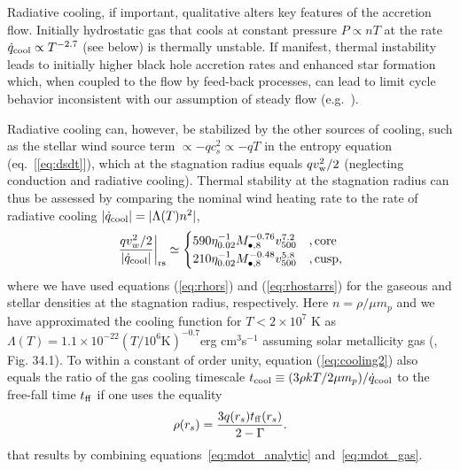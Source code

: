 \documentclass[usenatbib,fleqn]{mn2e}
\newcommand{\rs}{r_s}
\newcommand{\vw}{v_w}
\newcommand{\tff}{t_{\rm ff}}
\begin{document}
Radiative cooling, if important, qualitative alters key features of the accretion flow.  Initially hydrostatic gas that cools at constant pressure $P \propto nT$ at the rate $\dot{q}_{\rm cool} \propto T^{-2.7}$ (see below) is thermally unstable.  If manifest, thermal instability leads to initially higher black hole accretion rates and enhanced star formation which, when coupled to the flow by feed-back processes, can lead to limit cycle behavior inconsistent with our assumption of steady flow (e.g.~\citealt{Wang+14}).  

Radiative cooling can, however, be stabilized by the other sources of cooling, such as the stellar wind source term $\propto -q c_{s}^{2} \propto -qT$ in the entropy equation (eq.~[\ref{eq:dsdt}]), which at the stagnation radius equals $q v_{\rm w}^{2}/2$ (neglecting conduction and radiative cooling).  Thermal stability at the stagnation radius can thus be assessed by comparing the nominal wind heating rate to the rate of radiative cooling $|\dot{q}_{\rm cool}| =|\Lambda(T) n^2|$,
\begin{align}
\left.\frac{q \vw^2/2}{|\dot{q}_{\rm cool}|}\right|_{\rm r{s}} \simeq
  \begin{cases}
   590 \eta_{0.02}^{-1} M_{\bullet,8}^{-0.76}v_{500}^{7.2}  &, \text{core}\\
   210 \eta_{0.02}^{-1} M_{\bullet,8}^{-0.48}v_{500}^{5.8}  &, \text{cusp},     
  \end{cases}
  \label{eq:cooling2}
\end{align}
where we have used equations (\ref{eq:rhors}) and (\ref{eq:rhostarrs}) for the gaseous and stellar densities at the stagnation radius, respectively.  Here $n = \rho/\mu m_p$ and we have approximated the cooling function for $T < 2\times 10^{7}$ K as $\Lambda(T) = 1.1 \times 10^{-22} \left(T/10^6 \text{K}\right)^{-0.7}  $erg cm$^3 $s$^{-1}$ assuming solar metallicity gas (\citealt{Draine:2011a}, Fig. 34.1).  To within a constant of order unity, equation (\ref{eq:cooling2}) also equals the ratio of the gas cooling timescale $t_{\rm cool} \equiv (3\rho kT/2\mu m_p)/\dot{q}_{\rm cool}$ to the free-fall time $t_{\rm ff}$ if one uses the equality 
\begin{align}
\rho(\rs)=\frac{3 q(\rs) \tff(\rs)}{2-\Gamma}.
\label{eq:rhors2}
\end{align}
that results by combining equations~\eqref{eq:mdot_analytic} and~\eqref{eq:mdot_gas}.
\end{document}
